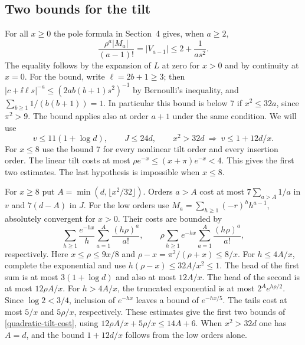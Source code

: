 \subsection{Two bounds for the tilt}
For all \(x\ge0\) the pole formula in Section~4 gives, when \(a\ge2\),
\[
 \frac{\rho^a|M_a|}{(a-1)!}
 =|V_{a-1}|\le 2+\frac1{as^2}.
\]
The equality follows by the expansion of \(L\) at zero for \(x>0\)
and by continuity at \(x=0\). For the bound, write \(\ell=2b+1\ge3\);
then \(|c+\ii\ell s|^{-a}\le(2ab(b+1)s^2)^{-1}\) by Bernoulli's
inequality, and \(\sum_{b\ge1}1/(b(b+1))=1\). In particular this
bound is below 7 if \(x^2\le32a\), since \(\pi^2>9\). The bound
applies also at order \(a+1\) under the same condition. We will use
\begin{equation}\label{quadratic-tilt-cost}
 v\le11(1+\log d),\qquad J\le24d,\qquad
 x^2>32d\ \Longrightarrow\ v\le1+12d/x.
\end{equation}
For \(x\le8\) use the bound 7 for every nonlinear tilt order and
every insertion order. The linear tilt costs at most
\(\rho e^{-x}\le(x+\pi)e^{-x}<4\). This gives the first two estimates.
The last hypothesis is impossible when \(x\le8\).

For \(x\ge8\) put \(A=\min(d,\lfloor x^2/32\rfloor)\). Orders
\(a>A\) cost at most \(7\sum_{a>A}1/a\) in \(v\) and \(7(d-A)\)
in \(J\). For the low orders use
\(M_a=\sum_{h\ge1}(-r)^h h^{a-1}\), absolutely convergent for \(x>0\).
Their costs are bounded by
\[
 \sum_{h\ge1}\frac{e^{-hx}}h\sum_{a=1}^A\frac{(h\rho)^a}{a!},
 \qquad
 \rho\sum_{h\ge1} e^{-hx}\sum_{a=1}^A\frac{(h\rho)^a}{a!},
\]
respectively. Here \(x\le\rho\le9x/8\) and
\(\rho-x=\pi^2/(\rho+x)\le 8/x\). For \(h\le4A/x\), complete the
exponential and use \(h(\rho-x)\le32A/x^2\le1\). The head of
the first sum is at most \(3(1+\log d)\) and also at most
\(12A/x\). The head of the second is at most \(12\rho A/x\).
For \(h>4A/x\), the truncated exponential is at most
\(2^A e^{h\rho/2}\). Since \(\log 2<3/4\), inclusion of \(e^{-hx}\)
leaves a bound of \(e^{-hx/5}\).
The tails cost at most \(5/x\) and \(5\rho/x\), respectively.
These estimates give the first two bounds of \eqref{quadratic-tilt-cost},
using \(12\rho A/x+5\rho/x\le14A+6\). When \(x^2>32d\) one has
\(A=d\), and the bound \(1+12d/x\) follows from the low orders alone.

